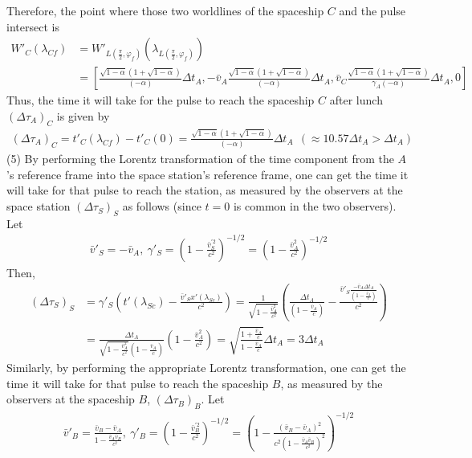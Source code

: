 \documentclass[12pt]{article}
\begin{document}
Therefore, the point where those two worldlines of the spaceship $C$ and the pulse intersect is
\begin{align*}
W'_C(\lambda_{Cf}) &= W'_{L(\frac{\pi}{2},\varphi_f)}(\lambda_{L(\frac{\pi}{2},\varphi_f)}) \\[1em]
&=  \left[\frac{\sqrt{1 - \alpha} \left( 1 + \sqrt{1 - \alpha} \right)}{(-\alpha)} \Delta t_A, - \bar{v}_A \frac{\sqrt{1 - \alpha} \left( 1 + \sqrt{1 - \alpha} \right)}{(-\alpha)} \Delta t_A, \bar{v}_C \frac{\sqrt{1 - \alpha} \left( 1 + \sqrt{1 - \alpha} \right)}{\gamma_A (-\alpha)} \Delta t_A, 0 \right]
\end{align*}
Thus, the time it will take for the pulse to reach the spaceship $C$ after lunch $(\Delta \tau_A)_C$ is given by
\begin{gather*}
(\Delta \tau_A)_C = t'_{C}(\lambda_{Cf}) - t'_{C}(0) = \frac{\sqrt{1 - \alpha} \left( 1 + \sqrt{1 - \alpha} \right)}{(-\alpha)} \Delta t_A ~~(\approx 10.57 \Delta t_A > \Delta t_A)
\end{gather*}
(5)
By performing the Lorentz transformation of the time component from the $A$'s reference frame into the space station's reference frame, one can get the time it will take for that pulse to reach the station, as measured by the observers at the space station $(\Delta \tau_S)_S$ as follows (since $t = 0$ is common in the two observers). Let 
\begin{gather*}
\bar{v}'_S = - \bar{v}_A, ~\gamma'_S = \left(1 - \frac{\bar{v}^{'2}_S}{c^2} \right)^{-1/2} = \left(1 - \frac{\bar{v}_A^2}{c^2} \right)^{-1/2}
\end{gather*}
Then, 
\begin{align*}
(\Delta \tau_S)_S &= \gamma'_S \left( t'(\lambda_{Sc}) - \frac{\bar{v}'_S x'(\lambda_{Sc})}{c^2}\right) = \frac{1}{\sqrt{1 - \frac{\bar{v}_A^2}{c^2}}} \left( \frac{\Delta t_A}{\left(1 - \frac{\bar{v}_A}{c} \right)} - \frac{\bar{v}'_S \frac{-\bar{v}_A \Delta t_A}{\left(1 - \frac{\bar{v}_A}{c} \right)}}{c^2}\right)\\[1em]
&= \frac{\Delta t_A}{\sqrt{1 - \frac{\bar{v}_A^2}{c^2}}\left(1 - \frac{\bar{v}_A}{c}\right)} \left( 1 - \frac{\bar{v}_A^2}{c^2}\right) = \sqrt{\frac{1 + \frac{\bar{v}_A}{c}}{1 - \frac{\bar{v}_A}{c}}} \Delta t_A = 3 \Delta t_A
\end{align*}
Similarly, by performing the appropriate Lorentz transformation, one can get the time it will take for that pulse to reach the spaceship $B$, as measured by the observers at the spaceship $B$, $(\Delta \tau_B)_B$. Let 
\begin{gather*}
\bar{v}'_B = \frac{\bar{v}_B - \bar{v}_A}{1 - \frac{\bar{v}_A \bar{v}_B}{c^2}},~ \gamma'_B = \left(1 - \frac{\bar{v}^{'2}_B}{c^2} \right)^{-1/2}  = \left(1 - \frac{\left(\bar{v}_B - \bar{v}_A\right)^2}{c^2 \left(1 - \frac{\bar{v}_A \bar{v}_B}{c^2} \right)^2} \right)^{-1/2}
\end{gather*}
\end{document}
